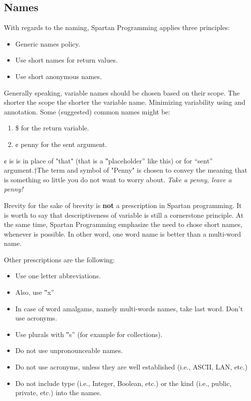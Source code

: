 \subsection{Names}
With regards to the naming, Spartan Programming applies three principles:
\begin{itemize}
  \item Generic names policy.
  \item Use short names for return values.
  \item Use short anonymous names.
\end{itemize}
Generally speaking, variable names should be chosen based on their scope.
The shorter the scope the shorter the variable name.
Minimizing variability using  and  annotation.
Some (suggested) common names might be:
\begin{enumerate}
  \item \$ for the return variable.
  \item ¢ penny for the sent argument.
\end{enumerate}
¢ is is in place of "that" (that is a ‟placeholder” like this) or for ``sent''
argument.†{The term and symbol of "Penny" is chosen to convey the meaning
  that is something so little you do not want to worry about.
  \emph{Take a penny, leave a penny!}}

Brevity for the sake of brevity is \textbf{not} a prescription in Spartan
programming.  It is worth to say that descriptiveness of variable is still a
cornerstone principle.  At the same time, Spartan Programming emphasize the
need to chose short names, whenever is possible.  In other word, one word name
is better than a multi-word name.

Other prescriptions are the following:
\begin{itemize}
  \item Use one letter abbreviations.
  \item Also, use ‟x”
  \item In case of word amalgams, namely multi-words names, take last word.
        Don't use acronyms.

  \item Use plurals with ‟s” (for example for collections).

  \item Do not use unpronounceable names.
  \item Do not use acronyms, unless they are well established (i.e., ASCII,
        LAN, etc.)

  \item Do not include type (i.e., Integer, Boolean, etc.) or the kind (i.e.,
        public, private, etc.) into the names.

\end{itemize}

